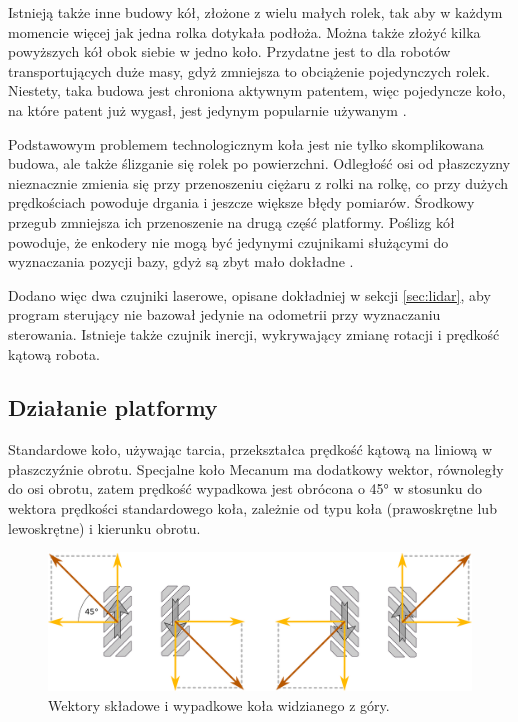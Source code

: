 	Istnieją także inne budowy kół, złożone z wielu małych rolek, tak aby w każdym momencie więcej jak jedna rolka dotykała podłoża.
	Można także złożyć kilka powyższych kół obok siebie w jedno koło.
	Przydatne jest to dla robotów transportujących duże masy, gdyż zmniejsza to obciążenie pojedynczych rolek.
	Niestety, taka budowa jest chroniona aktywnym patentem, więc pojedyncze koło, na które patent już wygasł, jest jedynym popularnie używanym \cite{paletobot}.

	Podstawowym problemem technologicznym koła jest nie tylko skomplikowana budowa, ale także ślizganie się rolek po powierzchni.
	Odległość osi od płaszczyzny nieznacznie zmienia się przy przenoszeniu ciężaru z rolki na rolkę, co przy dużych prędkościach powoduje drgania i jeszcze większe błędy pomiarów.
	Środkowy przegub zmniejsza ich przenoszenie na drugą część platformy.
	Poślizg kół powoduje, że enkodery nie mogą być jedynymi czujnikami służącymi do wyznaczania pozycji bazy, gdyż są zbyt mało dokładne \cite{heavy}.
	
	Dodano więc dwa czujniki laserowe, opisane dokładniej w sekcji \ref{sec:lidar}, aby program sterujący nie bazował jedynie na odometrii przy 
	wyznaczaniu sterowania. Istnieje także czujnik inercji, wykrywający zmianę rotacji i prędkość kątową robota.

	\subsection{Działanie platformy}
	Standardowe koło, używając tarcia, przekształca prędkość kątową na liniową w płaszczyźnie obrotu. 
	Specjalne koło Mecanum ma dodatkowy wektor, równoległy do osi obrotu, 
	zatem prędkość wypadkowa jest obrócona o 45° w stosunku do wektora prędkości standardowego koła, 
	zależnie od typu koła (prawoskrętne lub lewoskrętne) i kierunku obrotu.

	\begin{figure}[H]
	\centering
	\includegraphics[width=\textwidth]{graphics/vectors.pdf}
	\caption{Wektory składowe i wypadkowe koła widzianego z góry.}
	\label{fig:wheel_vectors}
	\end{figure} 

